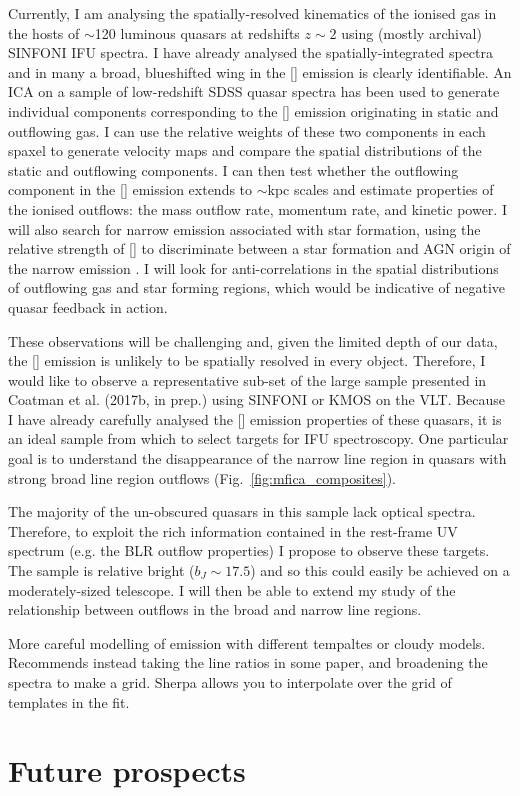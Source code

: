 Currently, I am analysing the spatially-resolved kinematics of the ionised gas in the hosts of $\sim$120 luminous quasars at redshifts $z\sim2$ using (mostly archival) SINFONI IFU spectra. 
I have already analysed the spatially-integrated spectra and in many a broad, blueshifted wing in the [] emission is clearly identifiable. 
An ICA on a sample of low-redshift SDSS quasar spectra has been used to generate individual components corresponding to the [] emission originating in static and outflowing gas. 
I can use the relative weights of these two components in each spaxel to generate velocity maps and compare the spatial distributions of the static and outflowing components.
I can then test whether the outflowing component in the [] emission extends to $\sim$kpc scales and
estimate properties of the ionised outflows: the mass outflow rate, momentum rate, and kinetic power.
I will also search for narrow \ha emission associated with star formation, using the relative strength of [] to discriminate between a star formation and AGN origin of the narrow \ha emission \citep{susie16}. 
I will look for anti-correlations in the spatial distributions of outflowing gas and star forming regions, which would be indicative of negative quasar feedback in action.

These observations will be challenging and, given the limited depth of our data, the [] emission is unlikely to be spatially resolved in every object. 
Therefore, I would like to observe a representative sub-set of the large sample presented in Coatman et al. (2017b, in prep.) using SINFONI or KMOS on the VLT. 
Because I have already carefully analysed the [] emission properties of these quasars, it is an ideal sample from which to select targets for IFU spectroscopy. 
One particular goal is to understand the disappearance of the narrow line region in quasars with strong broad line region outflows (Fig.~\ref{fig:mfica_composites}). 

The majority of the un-obscured quasars in this sample lack optical spectra. 
Therefore, to exploit the rich information contained in the rest-frame UV spectrum (e.g. the BLR outflow properties) I propose to observe these targets. 
The sample is relative bright ($b_J\sim17.5$) and so this could easily be achieved on a moderately-sized telescope. 
I will then be able to extend my study of the relationship between outflows in the broad and narrow line regions. 


More careful modelling of  emission with different tempaltes or cloudy models. 
 Recommends instead taking the line ratios in some paper, and broadening the spectra to make a grid. Sherpa allows you to interpolate over the grid of templates in the fit. 


\section{Future prospects}

